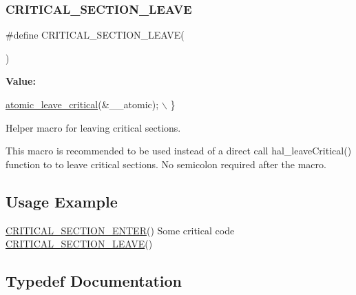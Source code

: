 \subsubsection{\texorpdfstring{C\+R\+I\+T\+I\+C\+A\+L\+\_\+\+S\+E\+C\+T\+I\+O\+N\+\_\+\+L\+E\+A\+VE}{CRITICAL\_SECTION\_LEAVE}}
{\footnotesize\ttfamily \#define C\+R\+I\+T\+I\+C\+A\+L\+\_\+\+S\+E\+C\+T\+I\+O\+N\+\_\+\+L\+E\+A\+VE(\begin{DoxyParamCaption}{ }\end{DoxyParamCaption})}

{\bfseries Value\+:}
\begin{DoxyCode}
\hyperlink{group__doc__driver__hal__helper__atomic_gaef0ccaa2438aca5ea074b36252d65990}{atomic\_leave\_critical}(&\_\_atomic);                                                     
                                   \(\backslash\)
    \}
\end{DoxyCode}


Helper macro for leaving critical sections. 

This macro is recommended to be used instead of a direct call hal\+\_\+leave\+Critical() function to to leave critical sections. No semicolon required after the macro.\hypertarget{group__doc__driver__hal__helper__atomic_atomic_usage}{}\subsection{Usage Example}\label{group__doc__driver__hal__helper__atomic_atomic_usage}

\begin{DoxyCode}
\hyperlink{group__doc__driver__hal__helper__atomic_ga039bfe712b6ba4388a35672f54763391}{CRITICAL\_SECTION\_ENTER}()
Some critical code
\hyperlink{group__doc__driver__hal__helper__atomic_ga6b32c9f95e7c6b604d621e215c514015}{CRITICAL\_SECTION\_LEAVE}()
\end{DoxyCode}
 

\subsection{Typedef Documentation}
\mbox{\label{group__doc__driver__hal__helper__atomic_ga6b3a0c9eea25111ac1877e0302e2fe1c}} 
